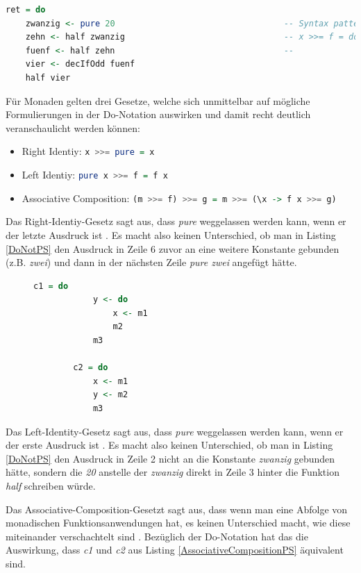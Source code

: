 \documentclass[
12pt,
ngerman,
oneside]
{scrbook} %
\begin{document}
\begin{lstlisting}[language=purescript, style=numbered-and-boxed, caption=Funktionen mit Monad-Anwendung in Do-Notation, label=DoNotPS]
ret = do 
	zwanzig <- pure 20									-- Syntax pattern: 						
	zehn <- half zwanzig								-- x >>= f = do y <- x
	fuenf <- half zehn									--  					  f y
	vier <- decIfOdd fuenf
	half vier
\end{lstlisting}

Für Monaden gelten drei Gesetze, welche sich unmittelbar auf mögliche Formulierungen in der Do-Notation auswirken und damit recht deutlich veranschaulicht werden können:
\begin{itemize}
  	\item Right Identiy: \lstinline[language=purescript, columns=fixed]{x >>= pure = x}
	\item Left Identiy: \lstinline[language=purescript, columns=fixed]{pure x >>= f = f x}
  	\item Associative Composition: \lstinline[language=purescript, columns=fixed]{(m >>= f) >>= g = m >>= (\x -> f x >>= g)}
\end{itemize}

Das Right-Identiy-Gesetz sagt aus, dass \emph{pure} weggelassen werden kann, wenn er der letzte Ausdruck ist \cite[][S. 102]{Freeman17}. Es macht also keinen Unterschied, ob man in Listing \ref{DoNotPS} den Ausdruck in Zeile 6 zuvor an eine weitere Konstante gebunden (z.B. \emph{zwei}) und dann in der nächsten Zeile \emph{pure zwei} angefügt hätte.

\begin{figure}
	\begin{lstlisting}[aboveskip=-1em, language=purescript, caption=Associative Composition, label=AssociativeCompositionPS]
		c1 = do 
			y <- do
				x <- m1
				m2 
			m3
			
		c2 = do 
			x <- m1
			y <- m2 
			m3
	\end{lstlisting}
\end{figure}

Das Left-Identity-Gesetz sagt aus, dass \emph{pure} weggelassen werden kann, wenn er der erste Ausdruck ist \cite[][S. 102--103]{Freeman17}. Es macht also keinen Unterschied, ob man in Listing \ref{DoNotPS} den Ausdruck in Zeile 2 nicht an die Konstante \emph{zwanzig} gebunden hätte, sondern die \emph{20} anstelle der \emph{zwanzig} direkt in Zeile 3 hinter die Funktion \emph{half} schreiben würde.

Das Associative-Composition-Gesetzt sagt aus, dass wenn man eine Abfolge von monadischen Funktionsanwendungen hat, es keinen Unterschied macht, wie diese miteinander verschachtelt sind \cite[][S. 103]{Freeman17}. Bezüglich der Do-Notation hat das die Auswirkung, dass \emph{c1} und \emph{c2} aus Listing \ref{AssociativeCompositionPS} äquivalent sind.
\end{document}
